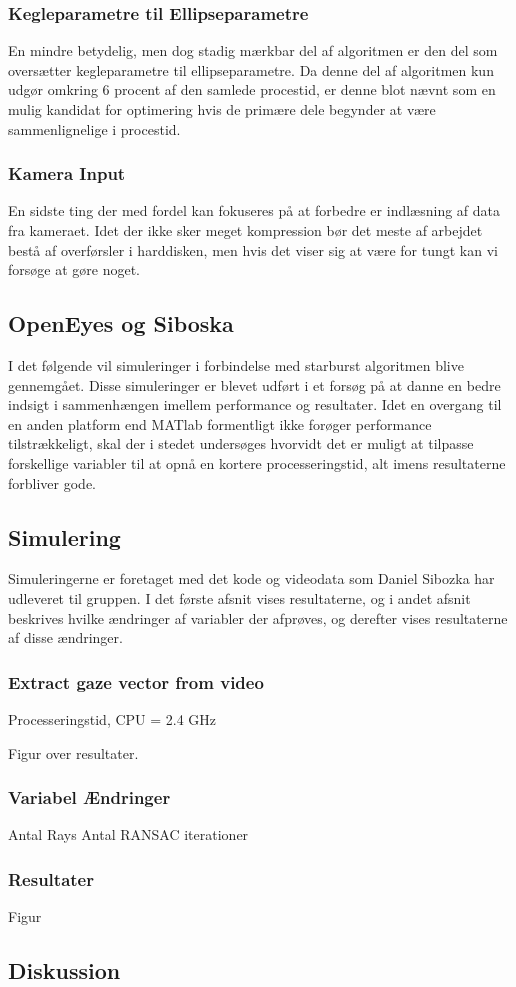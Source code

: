 \documentclass[rapport.tex]{subfiles}
\begin{document}
	\subsubsection{Kegleparametre til Ellipseparametre}
	En mindre betydelig, men dog stadig mærkbar del af algoritmen er den del som oversætter kegleparametre til ellipseparametre. Da denne del af algoritmen kun udgør omkring 6 procent af den samlede procestid, er denne blot nævnt som en mulig kandidat for optimering hvis de primære dele begynder at være sammenlignelige i procestid. 
	
	\subsubsection{Kamera Input}
	En sidste ting der med fordel kan fokuseres på at forbedre er indlæsning af data fra kameraet. Idet der ikke sker meget kompression bør det meste af arbejdet bestå af overførsler i harddisken, men hvis det viser sig at være for tungt kan vi forsøge at gøre noget.
	\subsection{OpenEyes og Siboska}
	I det følgende vil simuleringer i forbindelse med starburst algoritmen blive gennemgået. Disse simuleringer er blevet udført i et forsøg på at danne en bedre indsigt i sammenhængen imellem performance og resultater. Idet en overgang til en anden platform end MATlab formentligt ikke forøger performance tilstrækkeligt, skal der i stedet undersøges hvorvidt det er muligt at tilpasse forskellige variabler til at opnå en kortere processeringstid, alt imens resultaterne forbliver gode.
	
	\subsection{Simulering}
	
	Simuleringerne er foretaget med det kode og videodata som Daniel Sibozka har udleveret til gruppen. I det første afsnit vises resultaterne, og i andet afsnit beskrives hvilke ændringer af variabler der afprøves, og derefter vises resultaterne af disse ændringer.
	
	\subsubsection{Extract gaze vector from video}
	
	Processeringstid, CPU = 2.4 GHz
	
	Figur over resultater.
	
	\subsubsection{Variabel Ændringer}
	
	Antal Rays
	Antal RANSAC iterationer
	
	
	\subsubsection{Resultater}
	
	Figur 
	\subsection{Diskussion}
		
\end{document}
